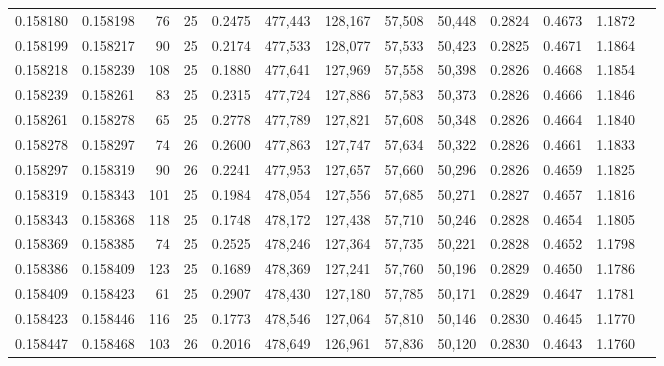 \begin{tabular}{rrrrrrrrrrrrr}
0.158180 & 0.158198 &    76 &  25 &                                     0.2475 & 477,443 & 128,167 &  57,508 &  50,448 & 0.2824 & 0.4673 & 1.1872 \\
0.158199 & 0.158217 &    90 &  25 &                                     0.2174 & 477,533 & 128,077 &  57,533 &  50,423 & 0.2825 & 0.4671 & 1.1864 \\
0.158218 & 0.158239 &   108 &  25 &                                     0.1880 & 477,641 & 127,969 &  57,558 &  50,398 & 0.2826 & 0.4668 & 1.1854 \\
0.158239 & 0.158261 &    83 &  25 &                                     0.2315 & 477,724 & 127,886 &  57,583 &  50,373 & 0.2826 & 0.4666 & 1.1846 \\
0.158261 & 0.158278 &    65 &  25 &                                     0.2778 & 477,789 & 127,821 &  57,608 &  50,348 & 0.2826 & 0.4664 & 1.1840 \\
0.158278 & 0.158297 &    74 &  26 &                                     0.2600 & 477,863 & 127,747 &  57,634 &  50,322 & 0.2826 & 0.4661 & 1.1833 \\
0.158297 & 0.158319 &    90 &  26 &                                     0.2241 & 477,953 & 127,657 &  57,660 &  50,296 & 0.2826 & 0.4659 & 1.1825 \\
0.158319 & 0.158343 &   101 &  25 &                                     0.1984 & 478,054 & 127,556 &  57,685 &  50,271 & 0.2827 & 0.4657 & 1.1816 \\
0.158343 & 0.158368 &   118 &  25 &                                     0.1748 & 478,172 & 127,438 &  57,710 &  50,246 & 0.2828 & 0.4654 & 1.1805 \\
0.158369 & 0.158385 &    74 &  25 &                                     0.2525 & 478,246 & 127,364 &  57,735 &  50,221 & 0.2828 & 0.4652 & 1.1798 \\
0.158386 & 0.158409 &   123 &  25 &                                     0.1689 & 478,369 & 127,241 &  57,760 &  50,196 & 0.2829 & 0.4650 & 1.1786 \\
0.158409 & 0.158423 &    61 &  25 &                                     0.2907 & 478,430 & 127,180 &  57,785 &  50,171 & 0.2829 & 0.4647 & 1.1781 \\
0.158423 & 0.158446 &   116 &  25 &                                     0.1773 & 478,546 & 127,064 &  57,810 &  50,146 & 0.2830 & 0.4645 & 1.1770 \\
0.158447 & 0.158468 &   103 &  26 &                                     0.2016 & 478,649 & 126,961 &  57,836 &  50,120 & 0.2830 & 0.4643 & 1.1760 \\

\end{tabular}
